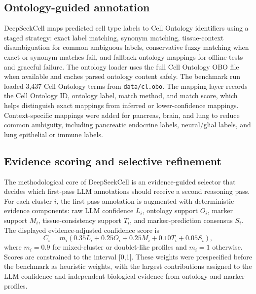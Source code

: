 \documentclass[referee,lineno,pdflatex]{sn-jnl}
\begin{document}
\subsection{Ontology-guided annotation}

DeepSeekCell maps predicted cell type labels to Cell Ontology identifiers using a staged strategy: exact label matching, synonym matching, tissue-context disambiguation for common ambiguous labels, conservative fuzzy matching when exact or synonym matches fail, and fallback ontology mappings for offline tests and graceful failure. The ontology loader uses the full Cell Ontology OBO file when available and caches parsed ontology content safely. The benchmark run loaded 3,437 Cell Ontology terms from \texttt{data/cl.obo}. The mapping layer records the Cell Ontology ID, ontology label, match method, and match score, which helps distinguish exact mappings from inferred or lower-confidence mappings. Context-specific mappings were added for pancreas, brain, and lung to reduce common ambiguity, including pancreatic endocrine labels, neural/glial labels, and lung epithelial or immune labels.

\subsection{Evidence scoring and selective refinement}

The methodological core of DeepSeekCell is an evidence-guided selector that decides which first-pass LLM annotations should receive a second reasoning pass. For each cluster $i$, the first-pass annotation is augmented with deterministic evidence components: raw LLM confidence $L_i$, ontology support $O_i$, marker support $M_i$, tissue-consistency support $T_i$, and marker-prediction consensus $S_i$. The displayed evidence-adjusted confidence score is
\begin{equation}
C_i=m_i(0.35L_i+0.25O_i+0.25M_i+0.10T_i+0.05S_i),
\label{eq:evidence-confidence}
\end{equation}
where $m_i=0.9$ for mixed-cluster or doublet-like profiles and $m_i=1$ otherwise. Scores are constrained to the interval [0,1]. These weights were prespecified before the benchmark as heuristic weights, with the largest contributions assigned to the LLM confidence and independent biological evidence from ontology and marker profiles.
\end{document}

